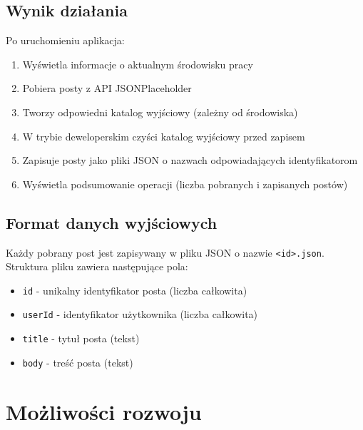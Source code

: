 \documentclass[12pt,a4paper]{article}
\begin{document}
\subsection{Wynik działania}
Po uruchomieniu aplikacja:
\begin{enumerate}
    \item Wyświetla informacje o aktualnym środowisku pracy
    \item Pobiera posty z API JSONPlaceholder
    \item Tworzy odpowiedni katalog wyjściowy (zależny od środowiska)
    \item W trybie deweloperskim czyści katalog wyjściowy przed zapisem
    \item Zapisuje posty jako pliki JSON o nazwach odpowiadających identyfikatorom
    \item Wyświetla podsumowanie operacji (liczba pobranych i zapisanych postów)
\end{enumerate}

\subsection{Format danych wyjściowych}
Każdy pobrany post jest zapisywany w pliku JSON o nazwie \texttt{<id>.json}. Struktura pliku zawiera następujące pola:
\begin{itemize}
    \item \texttt{id} - unikalny identyfikator posta (liczba całkowita)
    \item \texttt{userId} - identyfikator użytkownika (liczba całkowita)
    \item \texttt{title} - tytuł posta (tekst)
    \item \texttt{body} - treść posta (tekst)
\end{itemize}

\section{Możliwości rozwoju}
\end{document}
